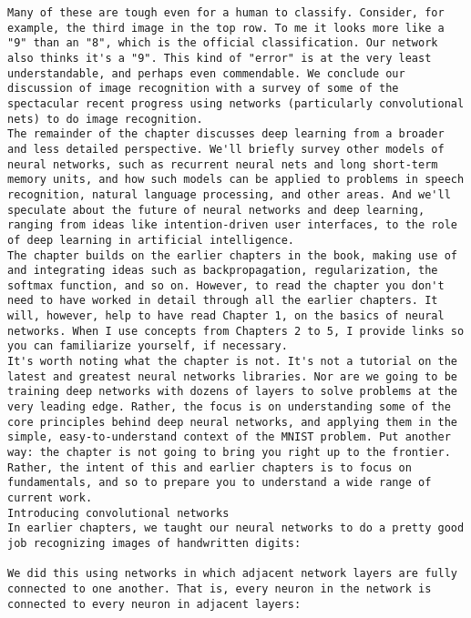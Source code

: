 \begin{lstlisting}
Many of these are tough even for a human to classify. Consider, for example, the third image in the top row. To me it looks more like a "9" than an "8", which is the official classification. Our network also thinks it's a "9". This kind of "error" is at the very least understandable, and perhaps even commendable. We conclude our discussion of image recognition with a survey of some of the spectacular recent progress using networks (particularly convolutional nets) to do image recognition.
The remainder of the chapter discusses deep learning from a broader and less detailed perspective. We'll briefly survey other models of neural networks, such as recurrent neural nets and long short-term memory units, and how such models can be applied to problems in speech recognition, natural language processing, and other areas. And we'll speculate about the future of neural networks and deep learning, ranging from ideas like intention-driven user interfaces, to the role of deep learning in artificial intelligence.
The chapter builds on the earlier chapters in the book, making use of and integrating ideas such as backpropagation, regularization, the softmax function, and so on. However, to read the chapter you don't need to have worked in detail through all the earlier chapters. It will, however, help to have read Chapter 1, on the basics of neural networks. When I use concepts from Chapters 2 to 5, I provide links so you can familiarize yourself, if necessary.
It's worth noting what the chapter is not. It's not a tutorial on the latest and greatest neural networks libraries. Nor are we going to be training deep networks with dozens of layers to solve problems at the very leading edge. Rather, the focus is on understanding some of the core principles behind deep neural networks, and applying them in the simple, easy-to-understand context of the MNIST problem. Put another way: the chapter is not going to bring you right up to the frontier. Rather, the intent of this and earlier chapters is to focus on fundamentals, and so to prepare you to understand a wide range of current work.
Introducing convolutional networks
In earlier chapters, we taught our neural networks to do a pretty good job recognizing images of handwritten digits:

We did this using networks in which adjacent network layers are fully connected to one another. That is, every neuron in the network is connected to every neuron in adjacent layers:


\end{lstlisting}
